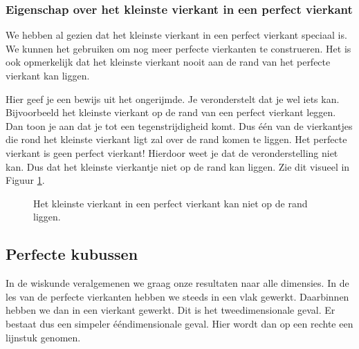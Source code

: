 \subsubsection{Eigenschap over het kleinste vierkant in een perfect vierkant}

We hebben al gezien dat het kleinste vierkant in een perfect vierkant speciaal is. We kunnen het gebruiken om nog meer perfecte vierkanten te construeren. Het is ook opmerkelijk dat het kleinste vierkant nooit aan de rand van het perfecte vierkant kan liggen.



Hier geef je een bewijs uit het ongerijmde. Je veronderstelt dat je wel iets kan. Bijvoorbeeld het kleinste vierkant op de rand van een perfect vierkant leggen. Dan toon je aan dat je tot een tegenstrijdigheid komt. Dus \'e\'en van de vierkantjes die rond het kleinste vierkant ligt zal over de rand komen te liggen. Het perfecte vierkant is geen perfect vierkant! Hierdoor weet je dat de veronderstelling niet kan. Dus dat het kleinste vierkantje niet op de rand kan liggen. Zie dit visueel in Figuur \ref{fig:pv_kleinstevierkant}.

\begin{figure}
\begin{center}
  
\end{center}
\caption{Het kleinste vierkant in een perfect vierkant kan niet op de rand liggen.}
\label{fig:pv_kleinstevierkant}
\end{figure}

\subsection{Perfecte kubussen}

In de wiskunde veralgemenen we graag onze resultaten naar alle dimensies. In de les van de perfecte vierkanten hebben we steeds in een vlak gewerkt. Daarbinnen hebben we dan in een vierkant gewerkt. Dit is het tweedimensionale geval. Er bestaat dus een simpeler \'e\'endimensionale geval. Hier wordt dan op een rechte een lijnstuk genomen.%

